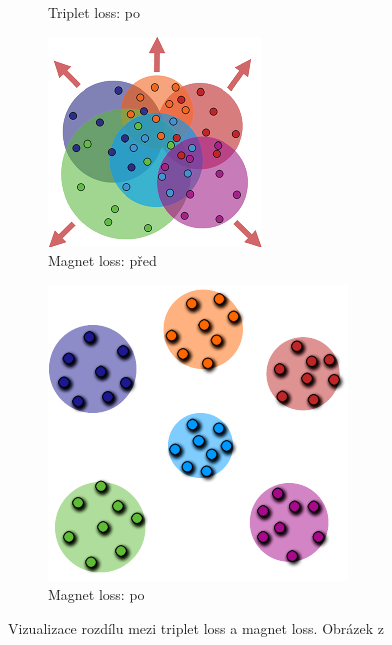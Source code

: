 \documentclass[10pt]{beamer}
\begin{document}
\begin{frame}
\begin{figure}[h]
\begin{subfigure}[b]{0.18\textwidth}
			\caption{Triplet loss: po}
		\end{subfigure}
		\hfill
		\begin{subfigure}[b]{0.18\textwidth}
			\centering
			\includegraphics[width=\textwidth]{images/triplet-magnet-difference/magnet_before.pdf}
			\caption{Magnet loss: před}
		\end{subfigure}
		\hfill
		\begin{subfigure}[b]{0.18\textwidth}
			\centering
			\includegraphics[width=\textwidth]{images/triplet-magnet-difference/magnet_after.pdf}
			\caption{Magnet loss: po}
		\end{subfigure}
		\caption{Vizualizace rozdílu mezi triplet loss a magnet loss. Obrázek z \cite{rippel_metric_2015}}
	\end{figure}
\end{frame}
\end{document}
